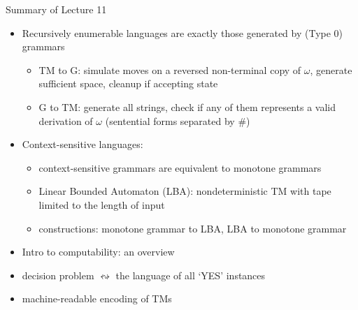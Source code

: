 \documentclass[handout]{beamer}
\begin{document}
\begin{frame}{Summary of Lecture 11}

    \begin{itemize}        
        \item Recursively enumerable languages are exactly those generated by (Type 0) grammars
        \begin{itemize}
            \item TM to G: simulate moves on a reversed non-terminal copy of $\omega$, generate sufficient space, cleanup if accepting state
            \item G to TM: generate all strings, check if any of them represents a valid derivation of $\omega$ (sentential forms separated by $\#$)
        \end{itemize}   
        \item Context-sensitive languages:
        \begin{itemize}
            \item context-sensitive grammars are equivalent to monotone grammars
            \item Linear Bounded Automaton (LBA): nondeterministic TM with tape limited to the length of input
            \item constructions: monotone grammar to LBA, LBA to monotone grammar
        \end{itemize}
        \item Intro to computability: an overview
        \item decision problem $\leftrightsquigarrow$ the language of all `YES' instances
        \item machine-readable encoding of TMs
    \end{itemize}
    
\end{frame}
\end{document}
